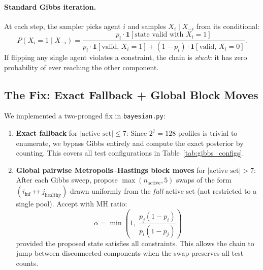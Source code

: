 \documentclass[11pt,a4paper]{article}
\begin{document}
\paragraph{Standard Gibbs iteration.}
At each step, the sampler picks agent $i$ and samples $X_i \mid X_{-i}$ from its conditional:
\[
  P(X_i = 1 \mid X_{-i}) = \frac{p_i \cdot \mathbf{1}[\text{state valid with } X_i=1]}
  {p_i \cdot \mathbf{1}[\text{valid, }X_i{=}1] + (1-p_i) \cdot \mathbf{1}[\text{valid, }X_i{=}0]}.
\]
If flipping any single agent violates a constraint, the chain is \emph{stuck}: it has zero probability of ever reaching the other component.


\subsection{The Fix: Exact Fallback + Global Block Moves}

We implemented a two-pronged fix in \texttt{bayesian.py}:

\begin{enumerate}
  \item \textbf{Exact fallback} for $|\text{active set}| \leq 7$:
    Since $2^7 = 128$ profiles is trivial to enumerate, we bypass Gibbs entirely and compute the exact posterior by counting.
    This covers all test configurations in Table~\ref{tab:gibbs_configs}.

  \item \textbf{Global pairwise Metropolis--Hastings block moves} for $|\text{active set}| > 7$:
    After each Gibbs sweep, propose $\max(n_{\text{active}}, 5)$ swaps of the form $(i_{\text{inf}} \leftrightarrow j_{\text{healthy}})$
    drawn uniformly from the \emph{full} active set (not restricted to a single pool).
    Accept with MH ratio:
    \[
      \alpha = \min\!\left(1,\; \frac{p_j (1-p_i)}{p_i (1-p_j)}\right)
    \]
    provided the proposed state satisfies all constraints.
    This allows the chain to jump between disconnected components when the swap preserves all test counts.
\end{enumerate}
\end{document}
